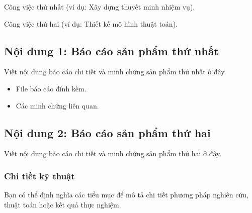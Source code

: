 \documentclass{baocaosanpham}
\begin{document}
\makeheader

\begin{tomtatketqua}
  \begin{tasks}
    \item Công việc thứ nhất (ví dụ: Xây dựng thuyết minh nhiệm vụ).
    \item Công việc thứ hai (ví dụ: Thiết kế mô hình thuật toán).
  \end{tasks}
  
\end{tomtatketqua}

\begin{minhchung}
  \subsection{Nội dung 1: Báo cáo sản phẩm thứ nhất}
  Viết nội dung báo cáo chi tiết và minh chứng sản phẩm thứ nhất ở đây.
  \begin{itemize}
    \item File báo cáo đính kèm.
    \item Các minh chứng liên quan.
  \end{itemize}

  \subsection{Nội dung 2: Báo cáo sản phẩm thứ hai}
  Viết nội dung báo cáo chi tiết và minh chứng sản phẩm thứ hai ở đây.
  
  \subsubsection{Chi tiết kỹ thuật}
  Bạn có thể định nghĩa các tiểu mục để mô tả chi tiết phương pháp nghiên cứu, thuật toán hoặc kết quả thực nghiệm.
\end{minhchung}
\end{document}
